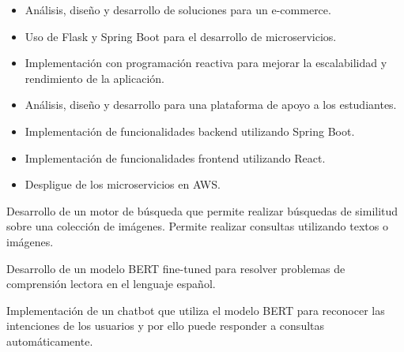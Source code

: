 \documentclass[10pt,a4paper,ragged2e,withhyper]{altacv}
\begin{document}
\begin{paracol}{2}
	\begin{itemize}
		\item Análisis, diseño y desarrollo de soluciones para un e-commerce.
		\item Uso de Flask y Spring Boot para el desarrollo de microservicios.
		\item Implementación con programación reactiva para mejorar la escalabilidad y rendimiento de la aplicación.
	\end{itemize}
	\divider

	\begin{itemize}
		\item Análisis, diseño y desarrollo para una plataforma de apoyo a los estudiantes.
		\item Implementación de funcionalidades backend utilizando Spring Boot.
		\item Implementación de funcionalidades frontend utilizando React.
		\item Despligue de los microservicios en AWS.
	\end{itemize}

	\divider

	{
		Desarrollo de un motor de búsqueda que permite realizar búsquedas de similitud sobre una colección de imágenes. Permite realizar consultas utilizando textos o imágenes.
	}
	\divider

	{
		Desarrollo de un modelo BERT fine-tuned para resolver problemas de comprensión lectora en el lenguaje español.
	}
	\divider

	{
		Implementación de un chatbot que utiliza el modelo BERT para reconocer las intenciones de los usuarios y por ello puede responder a consultas automáticamente.
	}
	\divider


\end{paracol}
\end{document}
